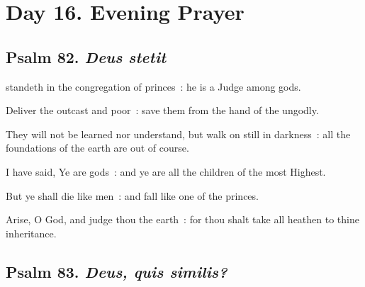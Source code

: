 \section*{Day 16. Evening Prayer}

\subsection{Psalm 82. \textit{Deus stetit}}

 standeth in the congregation of princes~: he is a Judge among gods.\par
{}
Deliver the outcast and poor~: save them from the hand of the ungodly.\par
{}They will not be learned nor understand, but walk on still in darkness~: all the foundations of the earth are out of course.\par
{}I have said, Ye are gods~: and ye are all the children of the most Highest.\par
{}But ye shall die like men~: and fall like one of the princes.\par
{}Arise, O God, and judge thou the earth~: for thou shalt take all heathen to thine inheritance.\par

\clearpage
\subsection{Psalm 83. \textit{Deus, quis similis?}}

